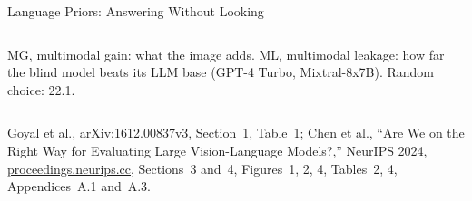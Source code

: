 \begin{frame}{Language Priors: Answering Without Looking}
\begin{columns}[T,onlytextwidth]
      \vspace{0.2em}
      {\scriptsize\raggedright MG, multimodal gain: what the image adds. ML, multimodal leakage: how far the blind model beats its LLM base (GPT-4 Turbo, Mixtral-8x7B). Random choice: 22.1.\par}
  \end{columns}
  \vspace{0.3em}
  {\scriptsize Goyal et al., \href{https://arxiv.org/abs/1612.00837v3}{arXiv:1612.00837v3}, Section~1, Table~1; Chen et al., ``Are We on the Right Way for Evaluating Large Vision-Language Models?,'' NeurIPS 2024, \href{https://proceedings.neurips.cc/paper_files/paper/2024/hash/2f8ee6a3d766b426d2618e555b5aeb39-Abstract-Conference.html}{proceedings.neurips.cc}, Sections~3 and~4, Figures~1, 2, 4, Tables~2, 4, Appendices~A.1 and~A.3.\par}
\end{frame}
